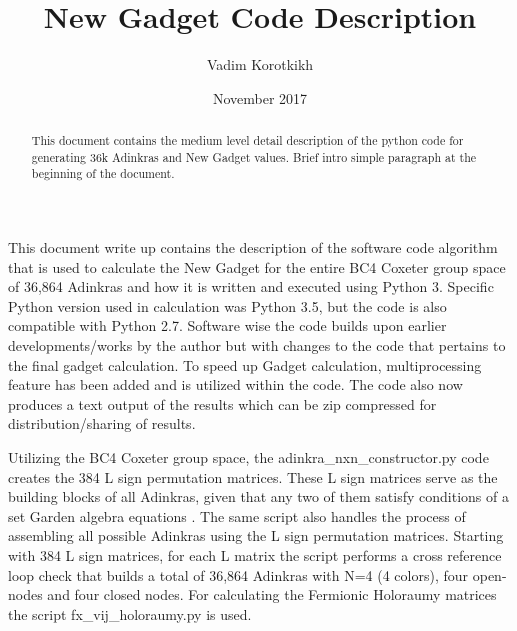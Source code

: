 \documentclass[12pt, letterpaper]{article}
\title{New Gadget Code Description}
\author{Vadim Korotkikh}
\date{November 2017}
\begin{document}
\maketitle

\begin{abstract}
This document contains the medium level detail description of the python code
for generating 36k Adinkras and New Gadget values. Brief intro simple paragraph
at the beginning of the document.
\end{abstract}

This document write up contains the description of the software code algorithm
that is used to calculate the New Gadget for the entire BC4 Coxeter group space
of 36,864 Adinkras and how it is written and executed using Python 3.
Specific Python version used in calculation was Python 3.5, but the code is also
compatible with Python 2.7.
Software wise the code builds upon earlier developments/works by the author but
with changes to the code that pertains to the final gadget calculation.
To speed up Gadget calculation, multiprocessing feature has been added and is
utilized within the code. The code also now produces a text output of the
results which can be zip compressed for distribution/sharing of results.\par
Utilizing the BC4 Coxeter group space, the adinkra{\_}nxn{\_}constructor.py
code creates the 384 L sign permutation matrices. These L sign matrices serve as the building 
blocks of all Adinkras, given that any two of them satisfy conditions of a set Garden algebra 
equations . The same script also handles the process of assembling all possible Adinkras 
using the L sign permutation matrices.
Starting with 384 L sign matrices, for each L matrix the script performs a cross reference loop 
check that builds a total of 36,864 Adinkras with N=4 (4 colors), four open-nodes and four 
closed nodes. For calculating the Fermionic Holoraumy matrices the script fx{\_}vij{\_}holoraumy.py is used. 
\end{document}
